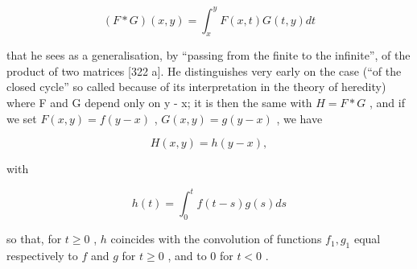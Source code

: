 \[
(F * G) (x, y) = \int_ {x} ^ {y} F (x, t) G (t, y) d t
\]

that he sees as a generalisation, by ``passing from the finite to the infinite'', of the product of two matrices {[}322 a{]}. He distinguishes very early on the case (``of the closed cycle'' so called because of its interpretation in the theory of heredity) where F and G depend only on y - x; it is then the same with \(H = F * G\) , and if we set \(F(x, y) = f(y - x)\) , \(G(x, y) = g(y - x)\) , we have

\[
H (x, y) = h (y - x),
\]

with

\[
h (t) = \int_ {0} ^ {t} f (t - s) g (s) d s
\]

so that, for \(t \geq 0\) , \(h\) coincides with the convolution of functions \(f_1, g_1\) equal respectively to \(f\) and \(g\) for \(t \geq 0\) , and to 0 for \(t < 0\) .

